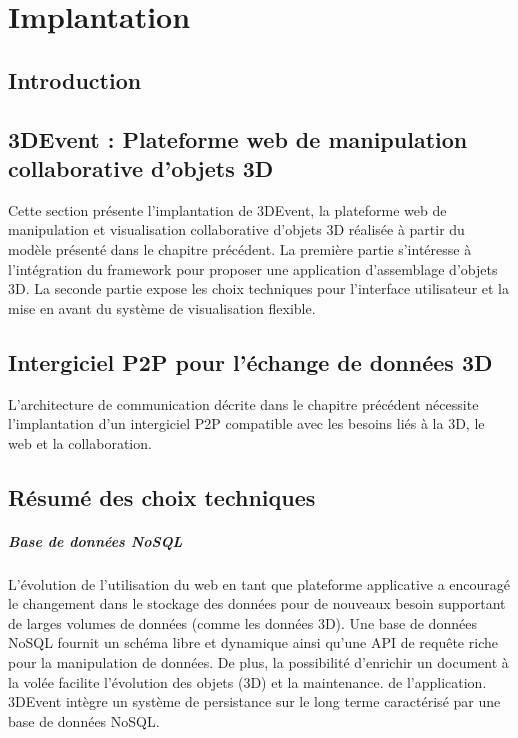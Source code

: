 
\chapter{Implantation}
\chaptertable

\section{Introduction}
\section{3DEvent : Plateforme web de manipulation collaborative d'objets 3D}

Cette section présente l'implantation de 3DEvent, la plateforme web de 
manipulation et visualisation collaborative d'objets 3D réalisée à partir du modèle 
présenté dans le chapitre précédent. La première partie s'intéresse à l'intégration 
du framework pour proposer une application d'assemblage d'objets 3D. La seconde 
partie expose les choix techniques pour l'interface utilisateur et la mise en avant 
du système de visualisation flexible.



\section{Intergiciel P2P pour l'échange de données 3D}

L'architecture de communication décrite dans le chapitre précédent nécessite 
l'implantation d'un intergiciel P2P compatible avec les besoins liés à la 3D, le 
web et la collaboration. 




\section{Résumé des choix techniques}

\paragraph{Base de données NoSQL}\label{p:nosql} L'évolution de 
l'utilisation du web en tant que plateforme applicative a encouragé le changement 
dans le stockage des données pour de nouveaux besoin supportant de larges 
volumes de données (comme les données 3D). Une base de données \gls{NoSQL} 
fournit un schéma libre et dynamique ainsi qu'une API de requête riche pour la 
manipulation de données. De plus, la possibilité d'enrichir un document à la volée 
facilite l'évolution des objets (3D) et la maintenance. de l'application.
3DEvent intègre un système de persistance sur le long terme caractérisé par une 
base de données \gls{NoSQL}.

